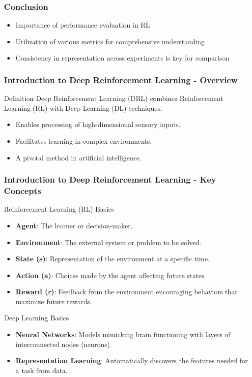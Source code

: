 \documentclass[aspectratio=169]{beamer}
\begin{document}
\begin{frame}[fragile]
    \frametitle{Conclusion}
    \begin{itemize}
        \item Importance of performance evaluation in RL
        \item Utilization of various metrics for comprehensive understanding
        \item Consistency in representation across experiments is key for comparison
    \end{itemize}
\end{frame}

\begin{frame}[fragile]
    \frametitle{Introduction to Deep Reinforcement Learning - Overview}
    \begin{block}{Definition}
        Deep Reinforcement Learning (DRL) combines Reinforcement Learning (RL) with Deep Learning (DL) techniques.
    \end{block}
    
    \begin{itemize}
        \item Enables processing of high-dimensional sensory inputs.
        \item Facilitates learning in complex environments.
        \item A pivotal method in artificial intelligence.
    \end{itemize}
\end{frame}

\begin{frame}[fragile]
    \frametitle{Introduction to Deep Reinforcement Learning - Key Concepts}
    \begin{block}{Reinforcement Learning (RL) Basics}
        \begin{itemize}
            \item \textbf{Agent}: The learner or decision-maker.
            \item \textbf{Environment}: The external system or problem to be solved.
            \item \textbf{State (s)}: Representation of the environment at a specific time.
            \item \textbf{Action (a)}: Choices made by the agent affecting future states.
            \item \textbf{Reward (r)}: Feedback from the environment encouraging behaviors that maximize future rewards.
        \end{itemize}
    \end{block}
    
    \begin{block}{Deep Learning Basics}
        \begin{itemize}
            \item \textbf{Neural Networks}: Models mimicking brain functioning with layers of interconnected nodes (neurons).
            \item \textbf{Representation Learning}: Automatically discovers the features needed for a task from data.
        \end{itemize}
    \end{block}
\end{frame}
\end{document}
